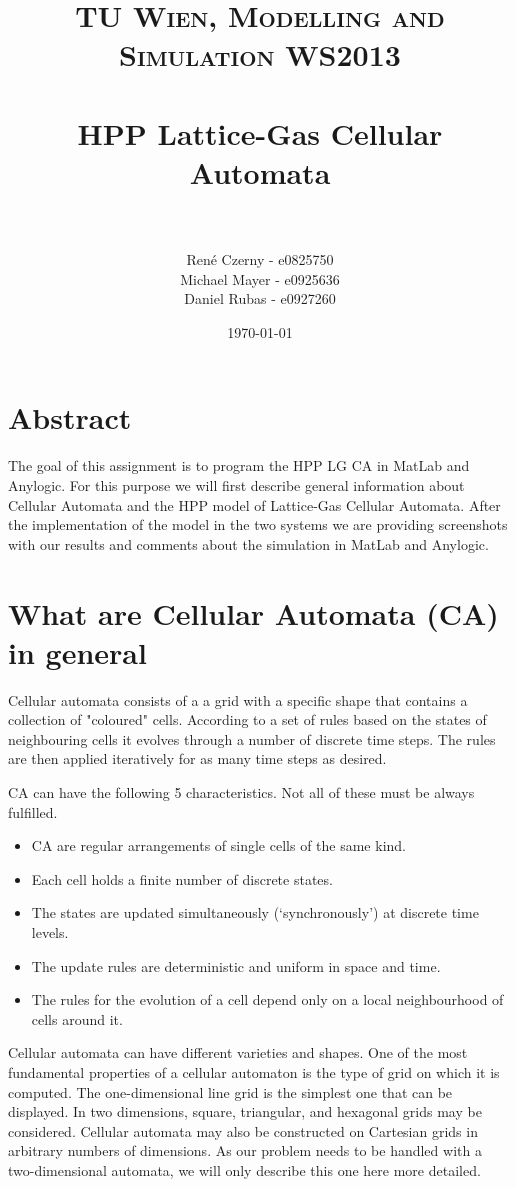 \documentclass[paper=a4, fontsize=11pt]{scrartcl} %
\title{	
\normalfont \normalsize 
\textsc{TU Wien, Modelling and Simulation WS2013} \\ [25pt] %
\horrule{0.5pt} \\[0.4cm] %
\huge HPP Lattice-Gas Cellular Automata \\ %
\horrule{2pt} \\[0.5cm] %
}
\author{René Czerny - e0825750\\Michael Mayer - e0925636\\Daniel Rubas - e0927260}
\date{\normalsize\today} %
\numberwithin{equation}{section} %
\numberwithin{figure}{section} %
\numberwithin{table}{section} %
\begin{document}
\maketitle %

\section{Abstract}

The goal of this assignment is to program the HPP LG CA in MatLab and Anylogic. For this purpose we will first describe general information about Cellular Automata and the HPP model of Lattice-Gas Cellular Automata. After the implementation of the model in the two systems we are providing screenshots with our results and comments about the simulation in MatLab and Anylogic.

\section{What are Cellular Automata (CA) in general}

Cellular automata consists of a a grid with a specific shape that contains a collection of "coloured" cells. According to a set of rules based on the states of neighbouring cells it evolves through a number of discrete time steps. The rules are then applied iteratively for as many time steps as desired. \cite{mathworld}

CA  can have the following 5 characteristics. Not all of these must be always fulfilled. 

\begin{itemize}
	\item CA are regular arrangements of single cells of the same kind.
	\item Each cell holds a finite number of discrete states.
	\item The states are updated simultaneously (`synchronously') at discrete time levels.
	\item The update rules are deterministic and uniform in space and time.
	\item The rules for the evolution of a cell depend only on a local neighbourhood of cells around it. 
	\cite{LGCA}
\end{itemize}

Cellular automata can have different varieties and shapes. One of the most fundamental properties of a cellular automaton is the type of grid on which it is computed. The one-dimensional line grid is the simplest one that can be displayed. In two dimensions, square, triangular, and hexagonal grids may be considered. Cellular automata may also be constructed on Cartesian grids in arbitrary numbers of dimensions. 
As our problem needs to be handled with a two-dimensional automata, we will only describe this one here more detailed.  \cite{mathworld}
\end{document}
